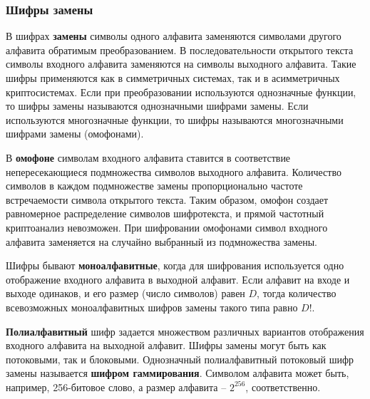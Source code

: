 \subsubsection{Шифры замены}

В шифрах \textbf{замены} символы одного алфавита заменяются символами другого алфавита обратимым преобразованием. В последовательности открытого текста символы входного алфавита заменяются на символы выходного алфавита. Такие шифры применяются как в симметричных системах, так и в асимметричных криптосистемах. Если при преобразовании используются однозначные функции, то шифры замены называются однозначными шифрами замены. Если используются многозначные функции, то шифры называются многозначными шифрами замены (омофонами).

В \textbf{омофоне} символам входного алфавита ставится в соответствие непересекающиеся подмножества символов выходного алфавита. Количество символов в каждом подмножестве замены пропорционально частоте встречаемости символа открытого текста. Таким образом, омофон создает равномерное распределение символов шифротекста, и прямой частотный криптоанализ невозможен. При шифровании омофонами символ входного алфавита заменяется на случайно выбранный из подмножества замены.

Шифры бывают \textbf{моноалфавитные}, когда для шифрования используется одно отображение входного алфавита в выходной алфавит. Если алфавит на входе и выходе одинаков, и его размер (число символов) равен $D$, тогда количество всевозможных моноалфавитных шифров замены такого типа равно $D!$.

\textbf{Полиалфавитный} шифр задается множеством различных вариантов отображения входного алфавита на выходной алфавит. Шифры замены могут быть как потоковыми, так и блоковыми. Однозначный полиалфавитный потоковый шифр замены называется \textbf{шифром гаммирования}. Символом алфавита может быть, например, 256-битовое слово, а размер алфавита -- $2^{256}$, соответственно.

